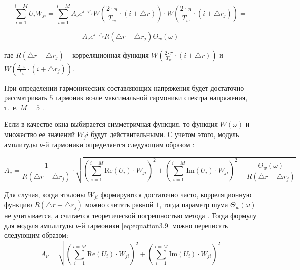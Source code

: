 \begin{equation}
	\label{eq:equation3.8}
	\displaystyle\sum_{i=1}^{i=M} U_i W_{ji} = \displaystyle\sum_{i=1}^{i=M} A_{\nu} e^{j \cdot \varphi_\nu} W\left( {\frac{2 \cdot \pi}{T_w} \cdot (i + \bigtriangleup r ) }\right) \cdot W\left( {\frac{2 \cdot \pi}{T_w} \cdot (i + \bigtriangleup r_j ) }\right) =
\end{equation}

$$
 A_{\nu} e^{j \cdot \varphi_\nu} R (\bigtriangleup r - \bigtriangleup r_j) \Theta_w(\omega)
$$

где $R (\bigtriangleup r - \bigtriangleup r_j)$ – корреляционная функция $W\left( {\frac{2 \cdot \pi}{T_w} \cdot (i + \bigtriangleup r) }\right)$  и $W\left( {\frac{2 \cdot \pi}{T_w} \cdot (i + \bigtriangleup r_j) }\right)$. 

При определении гармонических составляющих напряжения будет достаточно рассматривать $5$ гармоник возле максимальной гармоники спектра напряжения, т.~е. $M = 5$ \cite{Increase_Accuracy_Yelizarov2014}.
 
Если в качестве окна выбирается симметричная функция, то функция $W(\omega)$  и множество ее значений $W_ji$  будут действительными. С учетом этого, модуль амплитуды  $\nu$-й гармоники определяется следующим образом \cite{Increase_Accuracy_Yelizarov2014}:

\begin{equation}
	\label{eq:equation3.9}
	A_{\nu} = \frac{1}{R(\bigtriangleup r - \bigtriangleup r_j)} \cdot \sqrt{\left({\displaystyle\sum_{i=1}^{i=M}\mathrm{Re}(U_i) \cdot W_{ji}} \right)^2 + \left({\displaystyle\sum_{i=1}^{i=M}\mathrm{Im}(U_i) \cdot W_{ji}} \right)^2 - \frac{\Theta_w(\omega)}{R(\bigtriangleup r - \bigtriangleup r_j)}}
\end{equation}

Для случая, когда эталоны $W_{ji}$ формируются достаточно часто, корреляционную функцию $R(\bigtriangleup r - \bigtriangleup r_j) $  можно считать равной $1$, тогда параметр шума $\Theta_w(\omega)$ не учитывается, а считается теоретической погрешностью метода \cite{Increase_Accuracy_Yelizarov2014}. Тогда формулу для модуля амплитуды  $\nu$-й гармоники \ref{eq:equation3.9} можно переписать следующим образом:
\begin{equation}
	\label{eq:equation3.10}
	A_{\nu} =  \sqrt{\left({\displaystyle\sum_{i=1}^{i=M}\mathrm{Re}(U_i) \cdot W_{ji}} \right)^2 + \left({\displaystyle\sum_{i=1}^{i=M}\mathrm{Im}(U_i) \cdot W_{ji}} \right)^2}
\end{equation}

